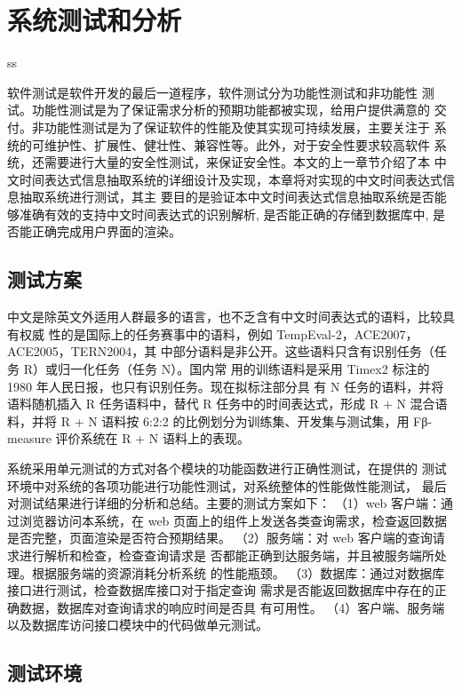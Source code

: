 
\chapter{系统测试和分析}ss

软件测试是软件开发的最后一道程序，软件测试分为功能性测试和非功能性
测试。功能性测试是为了保证需求分析的预期功能都被实现，给用户提供满意的
交付。非功能性测试是为了保证软件的性能及使其实现可持续发展，主要关注于
系统的可维护性、扩展性、健壮性、兼容性等。此外，对于安全性要求较高软件
系统，还需要进行大量的安全性测试，来保证安全性。本文的上一章节介绍了本
中文时间表达式信息抽取系统的详细设计及实现，本章将对实现的中文时间表达式信息抽取系统进行测试，其主
要目的是验证本中文时间表达式信息抽取系统是否能够准确有效的支持中文时间表达式的识别解析, 是否能正确的存储到数据库中, 是否能正确完成用户界面的渲染。

\section{测试方案}

中文是除英文外适用人群最多的语言，也不乏含有中文时间表达式的语料，比较具有权威
性的是国际上的任务赛事中的语料，例如 TempEval-2，ACE2007，ACE2005，TERN2004，其
中部分语料是非公开。这些语料只含有识别任务（任务 R）或归一化任务（任务 N）。国内常
用的训练语料是采用 Timex2 标注的 1980 年人民日报，也只有识别任务。现在拟标注部分具
有 N 任务的语料，并将语料随机插入 R 任务语料中，替代 R 任务中的时间表达式，形成 R +
N 混合语料，并将 R + N 语料按 6:2:2 的比例划分为训练集、开发集与测试集，用 Fβ-measure
评价系统在 R + N 语料上的表现。

系统采用单元测试的方式对各个模块的功能函数进行正确性测试，在提供的
测试环境中对系统的各项功能进行功能性测试，对系统整体的性能做性能测试，
最后对测试结果进行详细的分析和总结。主要的测试方案如下：
（1）web 客户端：通过浏览器访问本系统，在 web 页面上的组件上发送各类查询需求，检查返回数据是否完整，页面渲染是否符合预期结果。
（2）服务端：对 web 客户端的查询请求进行解析和检查，检查查询请求是
否都能正确到达服务端，并且被服务端所处理。根据服务端的资源消耗分析系统
的性能瓶颈。
（3）数据库：通过对数据库接口进行测试，检查数据库接口对于指定查询
需求是否能返回数据库中存在的正确数据，数据库对查询请求的响应时间是否具
有可用性。
（4）客户端、服务端以及数据库访问接口模块中的代码做单元测试。

\section{测试环境}

